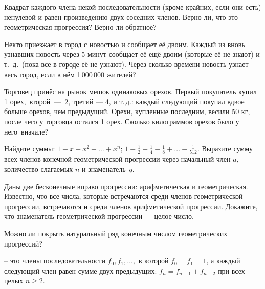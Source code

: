 \documentclass[a4paper,12pt]{article}
\begin{document}
Квадрат каждого члена некой последовательности (кроме крайних,
если они есть) ненулевой и равен произведению двух соседних членов. %
Верно ли,
что это %
геометрическая прогрессия?
Верно ли обратное?

 Некто приезжает в город с новостью и
сообщает е\"е двоим. Каждый из вновь узнавших новость через 5 минут
сообщает е\"е ещ\"е двоим (которые е\"е не знают) и
т.~д.~(пока все в городе е\"е не узнают).
Через сколько времени новость узнает весь город, если в н\"ем
1\,000\,000 жителей?

 Торговец прин\"ес на рынок мешок одинаковых орехов.
Первый покупатель купил 1 орех,~\hbox{второй ---~2,}
третий --- 4, и т.\,д.: каждый следующий %
покупал вдвое больше орехов, чем предыдущий.
Орехи, купленные последним, весили 50 кг, после чего у торговца
остался 1 орех. Сколько килограммов орехов было у него~вначале?

 Найдите суммы:
$1+x+x^2+\ldots+x^n$;
$1-\frac12+\frac14-\frac18+\ldots-\frac1{512}$.
%
 Выразите сумму
всех членов конечной геометрической прогрессии через начальный член $a$,
количество слагаемых $n$ и знаменатель~$q$.

Даны две бесконечные вправо прогрессии: арифметическая
и геометрическая. %
Известно, что все числа, которые встречаются среди членов геометрической
прогрессии, %
встречаются и среди членов арифметической прогрессии. %
Докажите, что знаменатель геометрической прогрессии --- целое число.

 Можно ли покрыть натуральный ряд конечным
числом геометрических прогрессий?


%

\vspace*{-3pt}

\vspace*{-8pt}


 -- это члены последовательности
$f_0,f_1,\ldots,$
в которой $f_0=f_1=1$, а
каждый следующий член равен сумме двух предыдущих:
$f_{n}=f_{n-1}+f_{n-2}$ при всех целых $n\geq2$.
\end{document}
